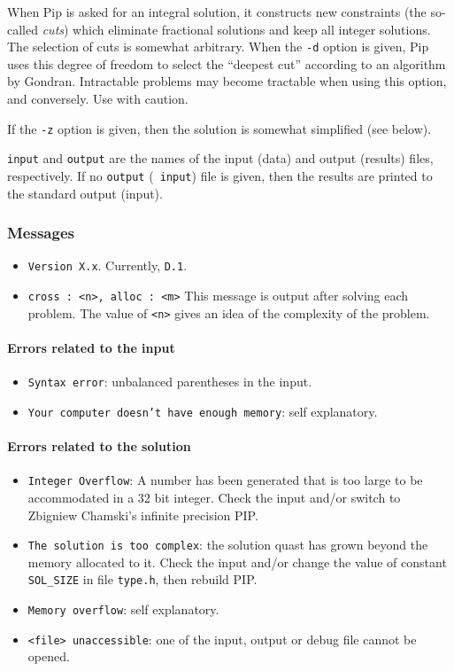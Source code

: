 \documentclass[12pt,a4paper,dvips]{article}
\begin{document}
When Pip is asked for an integral solution, it constructs new constraints
(the so-called {\em cuts}) which eliminate fractional solutions and keep
all integer solutions. The selection of cuts is somewhat arbitrary. When
the {\tt -d} option is given, Pip uses this degree of freedom to select
the ``deepest cut'' according to an algorithm by Gondran. Intractable
problems may become tractable when using this option, and conversely.
Use with caution.

If the {\tt -z} option is given, then the solution is somewhat simplified
(see below).

{\tt input} and {\tt output} are the names of the input (data) and
output (results) files, respectively. If no {\tt output} ({\tt
input}) file is given, then the results are printed to the standard
output (input).


\subsubsection{Messages}
\begin{itemize}

\item {\tt Version X.x}. Currently, {\tt D.1}.

\item {\tt cross : <n>, alloc : <m>} This message is output after solving
 each problem. The value of {\tt <n>} gives an idea of the complexity of
 the problem.
\end{itemize}

\paragraph{Errors related to the input}
\begin{itemize}
\item {\tt Syntax error}: unbalanced parentheses in the input.

\item {\tt Your computer doesn't have enough memory}: self explanatory.
\end{itemize}
\paragraph{Errors related to the solution}
\begin{itemize}
\item {\tt Integer Overflow}: A number has been generated that is too large
to be accommodated in a 32 bit integer. Check the input and/or switch
to Zbigniew Chamski's infinite precision PIP.

\item {\tt The solution is too complex}: the solution quast has grown beyond
the memory allocated to it. Check the input and/or change the value of
constant {\tt SOL\_SIZE} in file {\tt type.h}, then rebuild PIP.

\item {\tt Memory overflow}: self explanatory.

\item {\tt <file> unaccessible}: one of the input, output or debug file
cannot be opened.
\end{itemize}
\end{document}
